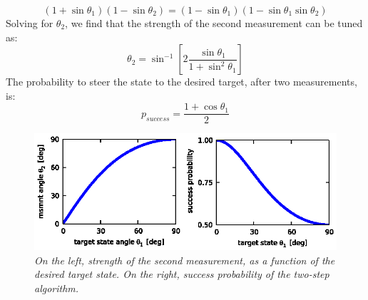 \begin{equation}
\left( 1 + \sin \theta_1 \right) \left( 1 - \sin \theta_2 \right) = \left( 1 - \sin \theta_1 \right) \left( 1 - \sin \theta_1 \sin \theta_2 \right)
\end{equation}
Solving for $\theta_2$, we find that the strength of the second measurement can be tuned as:
\begin{equation}
 \theta_2 =  \sin^{-1} \left[ 2\frac{\sin \theta_1}{1+\sin^2 \theta_1} \right]
\end{equation}
The probability to steer the state to the desired target, after two measurements, is:
\begin{equation}
 p_{success} = \frac{ 1 + \cos \theta_1 }{2}
\end{equation}


\begin{figure} 
\centering
\includegraphics [width = 12 cm]{SOM/fig09_adaptMsmsnt_angle.eps}
\caption{\textit{On the left, strength of the second measurement, as a function of the desired target state. On the right, success probability of the two-step algorithm.}}
\label{}
\end{figure} 


